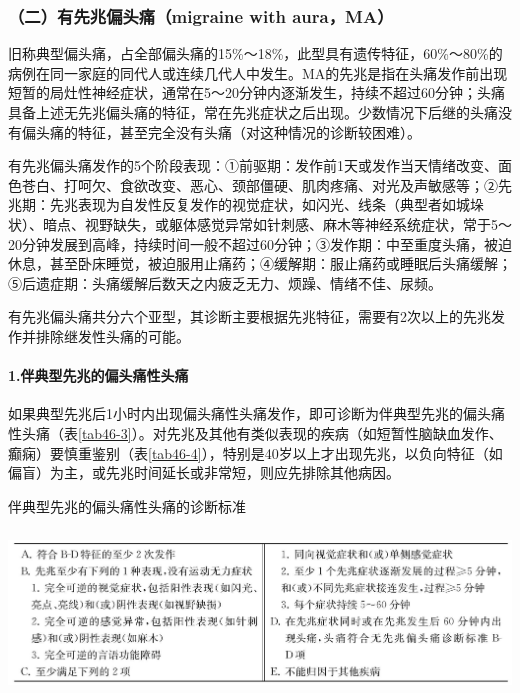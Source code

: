 \subsubsection{（二）有先兆偏头痛（migraine with aura，MA）}

旧称典型偏头痛，占全部偏头痛的15\%～18\%，此型具有遗传特征，60\%～80\%的病例在同一家庭的同代人或连续几代人中发生。MA的先兆是指在头痛发作前出现短暂的局灶性神经症状，通常在5～20分钟内逐渐发生，持续不超过60分钟；头痛具备上述无先兆偏头痛的特征，常在先兆症状之后出现。少数情况下后继的头痛没有偏头痛的特征，甚至完全没有头痛（对这种情况的诊断较困难）。

有先兆偏头痛发作的5个阶段表现：①前驱期：发作前1天或发作当天情绪改变、面色苍白、打呵欠、食欲改变、恶心、颈部僵硬、肌肉疼痛、对光及声敏感等；②先兆期：先兆表现为自发性反复发作的视觉症状，如闪光、线条（典型者如城垛状）、暗点、视野缺失，或躯体感觉异常如针刺感、麻木等神经系统症状，常于5～20分钟发展到高峰，持续时间一般不超过60分钟；③发作期：中至重度头痛，被迫休息，甚至卧床睡觉，被迫服用止痛药；④缓解期：服止痛药或睡眠后头痛缓解；⑤后遗症期：头痛缓解后数天之内疲乏无力、烦躁、情绪不佳、尿频。

有先兆偏头痛共分六个亚型，其诊断主要根据先兆特征，需要有2次以上的先兆发作并排除继发性头痛的可能。

\paragraph{1.伴典型先兆的偏头痛性头痛}

如果典型先兆后1小时内出现偏头痛性头痛发作，即可诊断为伴典型先兆的偏头痛性头痛（表\ref{tab46-3}）。对先兆及其他有类似表现的疾病（如短暂性脑缺血发作、癫痫）要慎重鉴别（表\ref{tab46-4}），特别是40岁以上才出现先兆，以负向特征（如偏盲）为主，或先兆时间延长或非常短，则应先排除其他病因。

\begin{table}[htbp]
\centering
\caption{伴典型先兆的偏头痛性头痛的诊断标准}
\label{tab46-3}
\includegraphics[width=5.9375in,height=1.70833in]{./images/Image00279.jpg}
\end{table}

